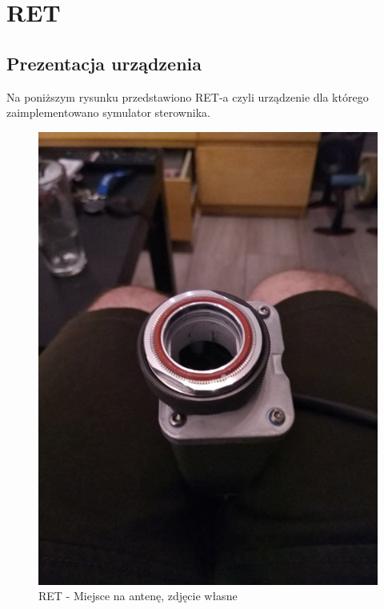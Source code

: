 \chapter{RET}
	\section{Prezentacja urządzenia}
		Na poniższym rysunku przedstawiono RET-a czyli urządzenie dla którego zaimplementowano symulator sterownika. 
		\autocite{KATHREIN_RET_1}
		\begin{figure}[h!]
		\centering
		\includegraphics[scale=0.4]{Obrazki/RET_1.png}
		\caption{RET - Miejsce na antenę, zdjęcie własne}
		\end{figure}

